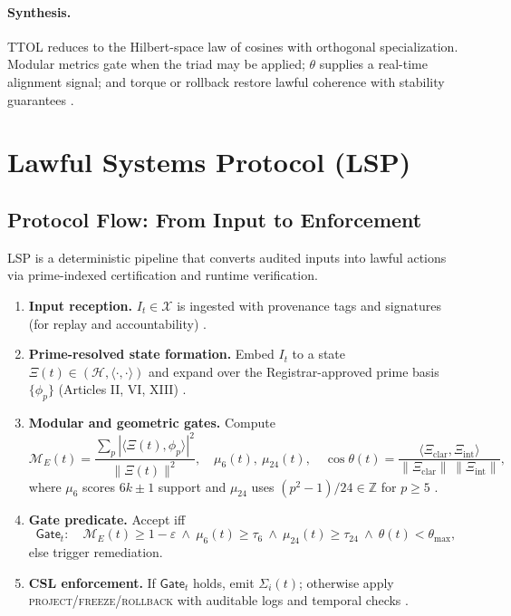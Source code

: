 \documentclass[12pt]{amsart}
\theoremstyle{plain}
\begin{document}
\paragraph{Synthesis.}
TTOL reduces to the Hilbert-space law of cosines with orthogonal specialization. Modular metrics gate when the triad may be applied; $\theta$ supplies a real-time alignment signal; and torque or rollback restore lawful coherence with stability guarantees \cite{rudin1991functional,lax2002functional,khalil2002nonlinear,hardy2008introduction,clarke1999model,baier2008model}.

\section{Lawful Systems Protocol (LSP)}

\subsection{Protocol Flow: From Input to Enforcement}
\noindent LSP is a deterministic pipeline that converts audited inputs into lawful actions via prime-indexed certification and runtime verification.

\begin{enumerate}
  \item \textbf{Input reception.} $I_t\in\mathcal{X}$ is ingested with provenance tags and signatures (for replay and accountability) \cite{schneider2000enforceable}.
  \item \textbf{Prime-resolved state formation.} Embed $I_t$ to a state $\Xi(t)\in(\mathcal{H},\langle\cdot,\cdot\rangle)$ and expand over the Registrar-approved prime basis $\{\phi_p\}$ (Articles II, VI, XIII) \cite{rudin1991functional,conway1990functional}.
  \item \textbf{Modular and geometric gates.} Compute
  \[
  \mathcal{M}_E(t)=\frac{\sum_{p}|\langle \Xi(t),\phi_p\rangle|^2}{\|\Xi(t)\|^2},\quad
  \mu_6(t),\ \mu_{24}(t),\quad
  \cos\theta(t)=\frac{\langle \Xi_{\mathrm{clar}},\Xi_{\mathrm{int}}\rangle}{\|\Xi_{\mathrm{clar}}\|\,\|\Xi_{\mathrm{int}}\|},
  \]
  where $\mu_6$ scores $6k\pm1$ support and $\mu_{24}$ uses $(p^2-1)/24\in\mathbb{Z}$ for $p\ge5$ \cite[Ch.~5]{hardy2008introduction}. 
  \item \textbf{Gate predicate.} Accept iff
  \[
  \mathsf{Gate}_t:\quad \mathcal{M}_E(t)\ge 1-\varepsilon\ \wedge\ \mu_6(t)\ge \tau_6\ \wedge\ \mu_{24}(t)\ge \tau_{24}\ \wedge\ \theta(t)<\theta_{\max},
  \]
  else trigger remediation.
  \item \textbf{CSL enforcement.} If $\mathsf{Gate}_t$ holds, emit $\Sigma_i(t)$; otherwise apply \textsc{project}/\textsc{freeze}/\textsc{rollback} with auditable logs and temporal checks \cite{schneider2000enforceable,clarke1999model,baier2008model}.
\end{enumerate}
\end{document}
